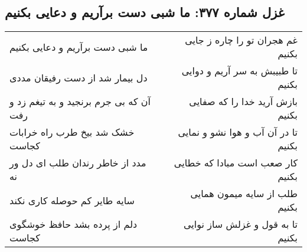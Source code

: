 \begin{center}
\section*{غزل شماره ۳۷۷: ما شبی دست برآریم و دعایی بکنیم}
\label{sec:sh377}
\begin{longtable}{l p{0.5cm} r}
ما شبی دست برآریم و دعایی بکنیم
&&
غم هجران تو را چاره ز جایی بکنیم
\\
دل بیمار شد از دست رفیقان مددی
&&
تا طبیبش به سر آریم و دوایی بکنیم
\\
آن که بی جرم برنجید و به تیغم زد و رفت
&&
بازش آرید خدا را که صفایی بکنیم
\\
خشک شد بیخ طرب راه خرابات کجاست
&&
تا در آن آب و هوا نشو و نمایی بکنیم
\\
مدد از خاطر رندان طلب ای دل ور نه
&&
کار صعب است مبادا که خطایی بکنیم
\\
سایه طایر کم حوصله کاری نکند
&&
طلب از سایه میمون همایی بکنیم
\\
دلم از پرده بشد حافظ خوشگوی کجاست
&&
تا به قول و غزلش ساز نوایی بکنیم
\\
\end{longtable}
\end{center}

